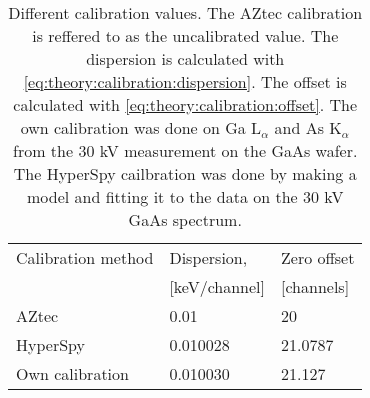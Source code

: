 \begin{table}[ht]
    \centering
    \caption{
        Different calibration values.
        The AZtec calibration is reffered to as the uncalibrated value.
        The dispersion is calculated with \cref{eq:theory:calibration:dispersion}.
        The offset is calculated with \cref{eq:theory:calibration:offset}.
        The own calibration was done on Ga L$_\alpha$ and As K$_\alpha$ from the 30 kV measurement on the GaAs wafer.
        The HyperSpy cailbration was done by making a model and fitting it to the data on the 30 kV GaAs spectrum.
    }
    \label{tab:results:calibrations}
    \begin{tabular}{m{4cm} m{2cm} m{2cm}}
        Calibration method & Dispersion,   & Zero offset \\
                           & [keV/channel] & [channels]  \\
        \hline
        AZtec              & 0.01          & 20          \\
        HyperSpy           & 0.010028      & 21.0787     \\
        Own calibration    & 0.010030      & 21.127
    \end{tabular}
\end{table}
